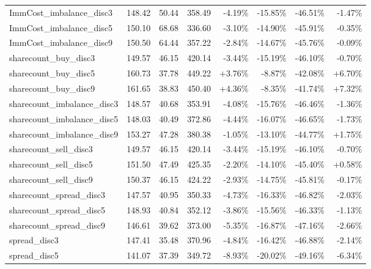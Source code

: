 \begin{table}[ht]
{\begin{tabular}{lRRR|RRRR}
ImmCost\_imbalance\_disc3      &    148.42 &   50.44 &  358.49 &   -4.19\% &  -15.85\% &  -46.51\% &       -1.47\% \\
ImmCost\_imbalance\_disc5      &    150.10 &   68.68 &  336.60 &   -3.10\% &  -14.90\% &  -45.91\% &       -0.35\% \\
ImmCost\_imbalance\_disc9      &    150.50 &   64.44 &  357.22 &   -2.84\% &  -14.67\% &  -45.76\% &       -0.09\% \\
sharecount\_buy\_disc3         &    149.57 &   46.15 &  420.14 &   -3.44\% &  -15.19\% &  -46.10\% &       -0.70\% \\
sharecount\_buy\_disc5         &    160.73 &   37.78 &  449.22 &    +3.76\% &   -8.87\% &  -42.08\% &        +6.70\% \\
sharecount\_buy\_disc9         &    161.65 &   38.83 &  450.40 &    +4.36\% &   -8.35\% &  -41.74\% &        +7.32\% \\
sharecount\_imbalance\_disc3   &    148.57 &   40.68 &  353.91 &   -4.08\% &  -15.76\% &  -46.46\% &       -1.36\% \\
sharecount\_imbalance\_disc5   &    148.03 &   40.49 &  372.86 &   -4.44\% &  -16.07\% &  -46.65\% &       -1.73\% \\
sharecount\_imbalance\_disc9   &    153.27 &   47.28 &  380.38 &   -1.05\% &  -13.10\% &  -44.77\% &        +1.75\% \\
sharecount\_sell\_disc3        &    149.57 &   46.15 &  420.14 &   -3.44\% &  -15.19\% &  -46.10\% &       -0.70\% \\
sharecount\_sell\_disc5        &    151.50 &   47.49 &  425.35 &   -2.20\% &  -14.10\% &  -45.40\% &        +0.58\% \\
sharecount\_sell\_disc9        &    150.37 &   46.15 &  424.22 &   -2.93\% &  -14.75\% &  -45.81\% &       -0.17\% \\
sharecount\_spread\_disc3      &    147.57 &   40.95 &  350.33 &   -4.73\% &  -16.33\% &  -46.82\% &       -2.03\% \\
sharecount\_spread\_disc5      &    148.93 &   40.84 &  352.12 &   -3.86\% &  -15.56\% &  -46.33\% &       -1.13\% \\
sharecount\_spread\_disc9      &    146.61 &   39.62 &  373.00 &   -5.35\% &  -16.87\% &  -47.16\% &       -2.66\% \\
spread\_disc3                 &    147.41 &   35.48 &  370.96 &   -4.84\% &  -16.42\% &  -46.88\% &       -2.14\% \\
spread\_disc5                 &    141.07 &   37.39 &  349.72 &   -8.93\% &  -20.02\% &  -49.16\% &       -6.34\% \\

\end{tabular}}
\end{table}
